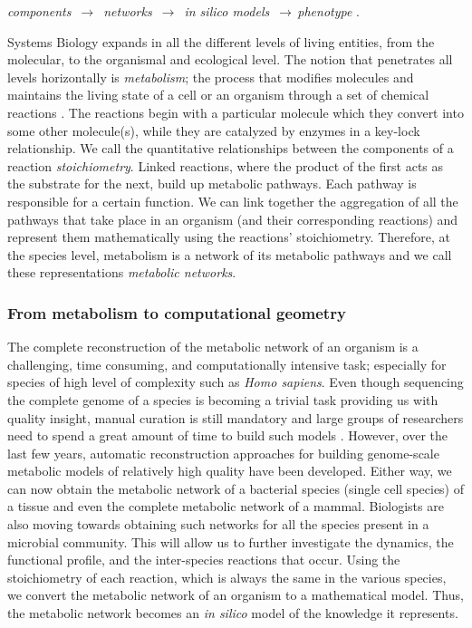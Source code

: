    \begin{center}
   \textit{components} $\,\to\,$ \textit{networks} $\,\to\,$ \textit{in silico models} $\,\to\,$\textit{phenotype} \cite{palsson2015systems}. \\ \end{center}

   Systems Biology expands in all the different levels of living entities, from the
   molecular, to the organismal and ecological level. The notion that
   penetrates all  levels horizontally is \emph{metabolism}; the
   process that modifies molecules and  maintains the living state of a
   cell or an organism through a set of chemical reactions
   \cite{schramski2015metabolic}. The reactions begin with a particular molecule
   which they convert into some other molecule(s), while they are catalyzed by
   enzymes in a key-lock relationship.
   We call the quantitative relationships between the components of a reaction   \emph{stoichiometry}.
   Linked reactions, where the product of the first acts as the substrate for the
   next, build up metabolic pathways. Each pathway is responsible for a certain
   function. We can link together the aggregation of all the pathways that take
   place in an organism (and their corresponding reactions)
   and represent them mathematically using  the reactions' stoichiometry.
   Therefore, at the species level, metabolism is a network of its metabolic pathways and we call
   these representations \emph{metabolic networks}.


   \subsubsection*{From metabolism to computational geometry}

   The complete reconstruction of the metabolic network of an organism is a
   challenging, time consuming, and computationally intensive task; especially for species of high level of complexity such as \emph{Homo sapiens}.
   Even though sequencing the complete genome of a species is becoming a trivial task
   providing us with quality insight, manual curation is still mandatory and large groups 
   of researchers need to spend a great amount of time to build such models \cite{thiele2010protocol}.
   However, over the last few years, automatic reconstruction approaches for building genome-scale metabolic 
   models \cite{machado2018fast} of relatively high quality have been developed.
   Either way, we can now obtain the metabolic network of a bacterial species (single cell species)
   of a tissue and even the complete metabolic network of a mammal.
   Biologists are also moving towards obtaining such networks for all the species present in a microbial community. This will allow us to further investigate the dynamics, the functional profile, and the inter-species reactions that occur.
   Using the stoichiometry of each reaction, which is always the same in the various species,
   we convert the metabolic network of an organism to a mathematical model.
   Thus, the metabolic network becomes an \emph{in silico} model of the knowledge it represents.
   
